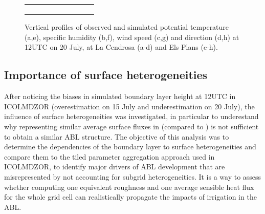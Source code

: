 \begin{figure}[hbtp]
{\begin{tabular}{@{}cccc@{}}
\begin{subfigure}[t]{0.283\textwidth}
        \end{subfigure} \\
    \end{tabular}
    }
    \caption{Vertical profiles of observed and simulated potential temperature (a,e), specific humidity (b,f), wind speed (c,g) and direction (d,h) at 12UTC on 20 July, at La Cendrosa (a-d) and Els Plans (e-h).}
    \label{fig:profiles_cendrosa_2007}
\end{figure}

\clearpage

\subsection{Importance of surface heterogeneities}
\label{sec:heterogeneities}

After noticing the biases in simulated boundary layer height at 12UTC in ICOLMDZOR (overestimation on 15 July and underestimation on 20 July), the influence of surface heterogeneities was investigated, in particular to underestand why representing similar average surface fluxes in \irrboost (compared to \mesomean) is not sufficient to obtain a similar ABL structure.
The objective of this analysis was to determine the dependencies of the \mesomean boundary layer to surface heterogeneities and compare them to the tiled parameter aggregation approach used in ICOLMDZOR, to identify major drivers of ABL development that are misrepresented by not accounting for subgrid heterogeneities. It is a way to assess whether computing one equivalent roughness and one average sensible heat flux for the whole grid cell can realistically propagate the impacts of irrigation in the ABL.


